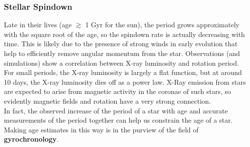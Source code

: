 \documentclass[10pt]{article}
\numberwithin{equation}{section}
\newcommand{\n}{\noindent}
\begin{document}
  \subsubsection{Stellar Spindown} %
  \label{ssub:stellar_spindown}
    Late in their lives (age $\gtrsim$ 1 Gyr for the sun), the period grows
    approximately with the square root of the age, so the spindown rate is
    actually decreasing with time. This is likely due to the presence of strong
    winds in early evolution that help to efficiently remove angular momentum
    from the star. Observations (and simulations) show a correlation between
    X-ray luminosity and rotation period. For small periods, the X-ray
    luminosity is largely a flat function, but at around 10 days, the X-ray
    luminosity dies off as a power law. X-Ray emission from stars are expected
    to arise from magnetic activity in the coronae of such stars, so evidently
    magnetic fields and rotation have a very strong connection.\\
    
    \n In fact, the observed increase of the period of a star with age and
    accurate measurements of the period together can help us constrain the age
    of a star. Making age estimates in this way is in the purview of the field
    of \textbf{gyrochronology}.
\end{document}

